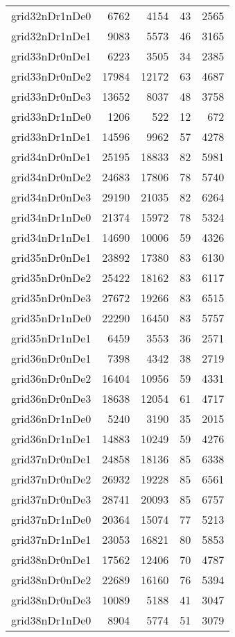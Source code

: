 \begin{longtable}{lrrrr}
grid32nDr1nDe0 & 6762 & 4154 & 43 & 2565 \\
grid32nDr1nDe1 & 9083 & 5573 & 46 & 3165 \\
grid33nDr0nDe1 & 6223 & 3505 & 34 & 2385 \\
grid33nDr0nDe2 & 17984 & 12172 & 63 & 4687 \\
grid33nDr0nDe3 & 13652 & 8037 & 48 & 3758 \\
grid33nDr1nDe0 & 1206 & 522 & 12 & 672 \\
grid33nDr1nDe1 & 14596 & 9962 & 57 & 4278 \\
grid34nDr0nDe1 & 25195 & 18833 & 82 & 5981 \\
grid34nDr0nDe2 & 24683 & 17806 & 78 & 5740 \\
grid34nDr0nDe3 & 29190 & 21035 & 82 & 6264 \\
grid34nDr1nDe0 & 21374 & 15972 & 78 & 5324 \\
grid34nDr1nDe1 & 14690 & 10006 & 59 & 4326 \\
grid35nDr0nDe1 & 23892 & 17380 & 83 & 6130 \\
grid35nDr0nDe2 & 25422 & 18162 & 83 & 6117 \\
grid35nDr0nDe3 & 27672 & 19266 & 83 & 6515 \\
grid35nDr1nDe0 & 22290 & 16450 & 83 & 5757 \\
grid35nDr1nDe1 & 6459 & 3553 & 36 & 2571 \\
grid36nDr0nDe1 & 7398 & 4342 & 38 & 2719 \\
grid36nDr0nDe2 & 16404 & 10956 & 59 & 4331 \\
grid36nDr0nDe3 & 18638 & 12054 & 61 & 4717 \\
grid36nDr1nDe0 & 5240 & 3190 & 35 & 2015 \\
grid36nDr1nDe1 & 14883 & 10249 & 59 & 4276 \\
grid37nDr0nDe1 & 24858 & 18136 & 85 & 6338 \\
grid37nDr0nDe2 & 26932 & 19228 & 85 & 6561 \\
grid37nDr0nDe3 & 28741 & 20093 & 85 & 6757 \\
grid37nDr1nDe0 & 20364 & 15074 & 77 & 5213 \\
grid37nDr1nDe1 & 23053 & 16821 & 80 & 5853 \\
grid38nDr0nDe1 & 17562 & 12406 & 70 & 4787 \\
grid38nDr0nDe2 & 22689 & 16160 & 76 & 5394 \\
grid38nDr0nDe3 & 10089 & 5188 & 41 & 3047 \\
grid38nDr1nDe0 & 8904 & 5774 & 51 & 3079 \\

\end{longtable}
